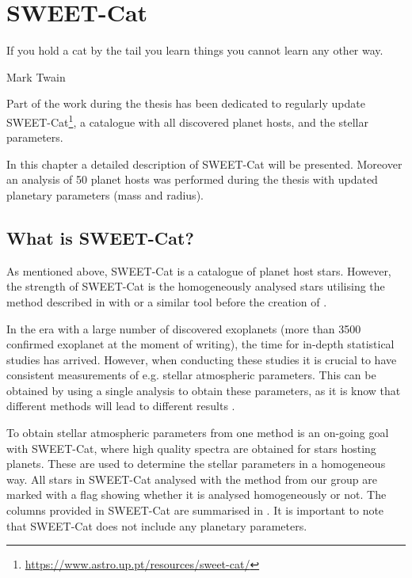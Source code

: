 \chapter{SWEET-Cat}
\label{cha:SWEET-Cat}
\epigraph{If you hold a cat by the tail you learn things you cannot learn any other way.}{Mark Twain}


Part of the work during the thesis has been dedicated to regularly update
SWEET-Cat\footnote{\url{https://www.astro.up.pt/resources/sweet-cat/}}, a catalogue with all
discovered planet hosts, and the stellar parameters.

In this chapter a detailed description of SWEET-Cat will be presented. Moreover an analysis of 50
planet hosts was performed during the thesis with updated planetary parameters (mass and radius).


\section{What is SWEET-Cat?}

As mentioned above, SWEET-Cat is a catalogue of planet host stars. However, the strength of
SWEET-Cat is the homogeneously analysed stars utilising the method described in
 with  or a similar tool before the creation of .

In the era with a large number of discovered exoplanets (more than 3500 confirmed exoplanet at the
moment of writing), the time for in-depth statistical studies has arrived. However, when conducting
these studies it is crucial to have consistent measurements of e.g. stellar atmospheric parameters.
This can be obtained by using a single analysis to obtain these parameters, as it is know that
different methods will lead to different results \citep[see e.g.][for a recent review]{Hinkel2016}.

To obtain stellar atmospheric parameters from one method is an on-going goal with SWEET-Cat, where
high quality spectra are obtained for stars hosting planets. These are used to determine the stellar
parameters in a homogeneous way. All stars in SWEET-Cat analysed with the method from our group are
marked with a flag showing whether it is analysed homogeneously or not. The columns provided in
SWEET-Cat are summarised in . It is important to note that SWEET-Cat does not
include any planetary parameters.

